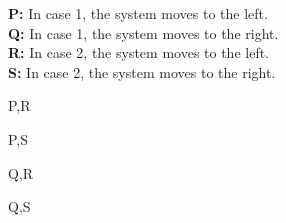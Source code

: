 \documentclass[journal,12pt,onecolumn]{IEEEtran}
\theoremstyle{remark}
\begin{document}
\begin{enumerate}
		\textbf{P:} In case 1, the system moves to the left.\\
		\textbf{Q:} In case 1, the system moves to the right.\\
		\textbf{R:} In case 2, the system moves to the left.\\
		\textbf{S:} In case 2, the system moves to the right.
		\begin{enumerate}
		\end{enumerate}

\end{enumerate}
\end{document}
